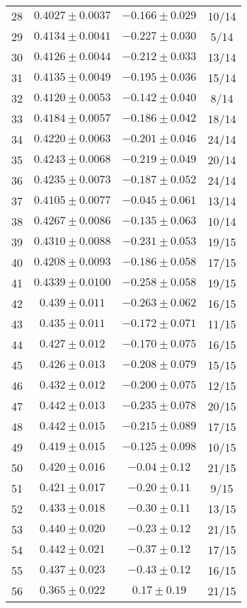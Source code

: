 \begin{tabular}{c|c|c|c}
28 & $0.4027\pm0.0037$ & $-0.166\pm0.029$ & 10/14 \\
29 & $0.4134\pm0.0041$ & $-0.227\pm0.030$ & 5/14 \\
30 & $0.4126\pm0.0044$ & $-0.212\pm0.033$ & 13/14 \\
31 & $0.4135\pm0.0049$ & $-0.195\pm0.036$ & 15/14 \\
32 & $0.4120\pm0.0053$ & $-0.142\pm0.040$ & 8/14 \\
33 & $0.4184\pm0.0057$ & $-0.186\pm0.042$ & 18/14 \\
34 & $0.4220\pm0.0063$ & $-0.201\pm0.046$ & 24/14 \\
35 & $0.4243\pm0.0068$ & $-0.219\pm0.049$ & 20/14 \\
36 & $0.4235\pm0.0073$ & $-0.187\pm0.052$ & 24/14 \\
37 & $0.4105\pm0.0077$ & $-0.045\pm0.061$ & 13/14 \\
38 & $0.4267\pm0.0086$ & $-0.135\pm0.063$ & 10/14 \\
39 & $0.4310\pm0.0088$ & $-0.231\pm0.053$ & 19/15 \\
40 & $0.4208\pm0.0093$ & $-0.186\pm0.058$ & 17/15 \\
41 & $0.4339\pm0.0100$ & $-0.258\pm0.058$ & 19/15 \\
42 & $0.439\pm0.011$ & $-0.263\pm0.062$ & 16/15 \\
43 & $0.435\pm0.011$ & $-0.172\pm0.071$ & 11/15 \\
44 & $0.427\pm0.012$ & $-0.170\pm0.075$ & 16/15 \\
45 & $0.426\pm0.013$ & $-0.208\pm0.079$ & 15/15 \\
46 & $0.432\pm0.012$ & $-0.200\pm0.075$ & 12/15 \\
47 & $0.442\pm0.013$ & $-0.235\pm0.078$ & 20/15 \\
48 & $0.442\pm0.015$ & $-0.215\pm0.089$ & 17/15 \\
49 & $0.419\pm0.015$ & $-0.125\pm0.098$ & 10/15 \\
50 & $0.420\pm0.016$ & $-0.04\pm0.12$ & 21/15 \\
51 & $0.421\pm0.017$ & $-0.20\pm0.11$ & 9/15 \\
52 & $0.433\pm0.018$ & $-0.30\pm0.11$ & 13/15 \\
53 & $0.440\pm0.020$ & $-0.23\pm0.12$ & 21/15 \\
54 & $0.442\pm0.021$ & $-0.37\pm0.12$ & 17/15 \\
55 & $0.437\pm0.023$ & $-0.43\pm0.12$ & 16/15 \\
56 & $0.365\pm0.022$ & $0.17\pm0.19$ & 21/15 \\

\end{tabular}
